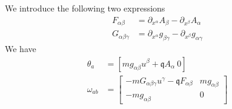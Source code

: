 We introduce the following two expressions
\begin{equation}
	\begin{aligned}
		F_{\alpha\beta} &= \partial_{x^\alpha} A_\beta - \partial_{x^\beta} A_\alpha \\
		G_{\alpha\beta\gamma} &= \partial_{x^\alpha} g_{\beta \gamma} - \partial_{x^\beta} g_{\alpha \gamma} 
	\end{aligned}
\end{equation}
We have
\begin{equation}\label{rp-cm-rm-kinematicSymplecticForm}
	\begin{aligned}
		\theta_a &= [m g_{\alpha\beta} u^{\beta} + \mathfrak{q} A_{\alpha} \ 0] \\
		\omega_{ab} &= \left[ \begin{matrix}
			- m G_{\alpha\beta\gamma} u^\gamma - \mathfrak{q} F_{\alpha\beta} & mg_{\alpha \beta} \\[2.2ex]
			- mg_{\alpha \beta} & 0 \end{matrix} \right] \\
	\end{aligned}
\end{equation}

